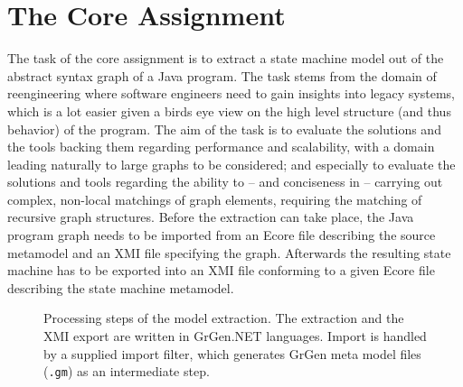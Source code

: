 \documentclass[copyright]{eptcs}
\begin{document}
\section{The Core Assignment}

The task of the core assignment is to extract a state machine model out of the abstract syntax graph of a Java program.
The task stems from the domain of reengineering where software engineers need to gain insights into legacy systems, which is a lot easier given a birds eye view on the high level structure (and thus behavior) of the program.
The aim of the task is to evaluate the solutions and the tools backing them regarding performance and scalability, with a domain leading naturally to large graphs to be considered;
and especially to evaluate the solutions and tools regarding the ability to -- and conciseness in -- carrying out complex, non-local matchings of graph elements, requiring the matching of recursive graph structures.
Before the extraction can take place, the Java program graph needs to be imported from an Ecore file describing the source metamodel and an XMI file specifying the graph.
Afterwards the resulting state machine has to be exported into an XMI file conforming to a given Ecore file describing the state machine metamodel.

\begin{figure}[tb]
	\caption{Processing steps of the model extraction. The extraction and the XMI export are written in GrGen.NET languages. Import is handled by a supplied import filter, which generates GrGen meta model files (\texttt{.gm}) as an intermediate step.}
	\label{fig:overview}
\end{figure}
\end{document}
